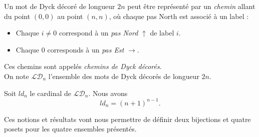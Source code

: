 Un mot de Dyck décoré de longueur $2n$ peut être représenté par un 
\emph{chemin} allant du point $(0,0)$ au point $(n,n)$, où chaque pas
North est associé à un label :
\begin{itemize}
    \item Chaque $i \neq 0$ correspond à un \emph{pas Nord} $\uparrow$
    de label $i$.
    \item Chaque $0$ corresponds à un \emph{pas Est} $\rightarrow$.
\end{itemize}

Ces chemins sont appelés \emph{chemins de Dyck décorés}.\\
On note $\mathcal{LD}_n$ l'ensemble des mots de Dyck décorés de longueur
$2n$.

\begin{theorem}
    Soit $ld_n$ le cardinal de $\mathcal{LD}_n$.
    Nous avons $$ld_n = (n + 1)^{n - 1}.$$
\end{theorem}

Ces notions et résultats vont nous permettre de définir deux bijections
et quatre posets pour les quatre ensembles présentés.